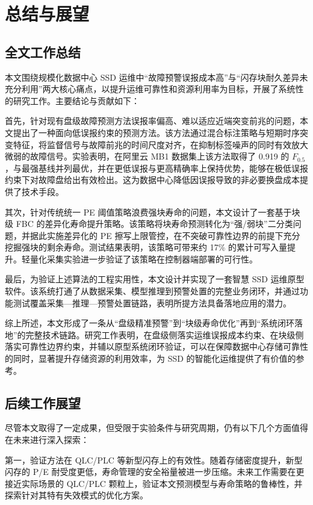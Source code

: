 \chapter{总结与展望}

\section{全文工作总结}

本文围绕规模化数据中心 SSD 运维中“故障预警误报成本高”与“闪存块耐久差异未充分利用”两大核心痛点，以提升运维可靠性和资源利用率为目标，开展了系统性的研究工作。主要结论与贡献如下：

首先，针对现有盘级故障预测方法误报率偏高、难以适应近端突变前兆的问题，本文提出了一种面向低误报约束的预测方法。该方法通过混合标注策略与短期时序突变特征，将监督信号与故障前兆的时间尺度对齐，在抑制标签噪声的同时有效放大微弱的故障信号。实验表明，在阿里云 MB1 数据集上该方法取得了 0.919 的 $F_{0.5}$，与最强基线并列最优，并在更低误报与更高精确率上保持优势，能够在极低误报约束下对故障盘给出有效检出。这为数据中心降低因误报导致的非必要换盘成本提供了技术手段。

其次，针对传统统一 PE 阈值策略浪费强块寿命的问题，本文设计了一套基于块级 FBC 的差异化寿命提升策略。该策略将块寿命预测转化为“强/弱块”二分类问题，并据此实施差异化的 PE 擦写上限管控，在不突破可靠性边界的前提下充分挖掘强块的剩余寿命。测试结果表明，该策略可带来约 17\% 的累计可写入量提升。轻量化采集实验进一步验证了该策略在控制器端部署的可行性。

最后，为验证上述算法的工程实用性，本文设计并实现了一套智慧 SSD 运维原型软件。该系统打通了从数据采集、模型推理到预警处置的完整业务闭环，并通过功能测试覆盖采集—推理—预警处置链路，表明所提方法具备落地应用的潜力。

综上所述，本文形成了一条从“盘级精准预警”到“块级寿命优化”再到“系统闭环落地”的完整技术链路。研究工作表明，在盘级侧落实运维误报成本约束、在块级侧落实可靠性边界约束，并辅以原型系统闭环验证，可以在保障数据中心存储可靠性的同时，显著提升存储资源的利用效率，为 SSD 的智能化运维提供了有价值的参考。

\section{后续工作展望}

尽管本文取得了一定成果，但受限于实验条件与研究周期，仍有以下几个方面值得在未来进行深入探索：

第一，验证方法在 QLC/PLC 等新型闪存上的有效性。随着存储密度提升，新型闪存的 P/E 耐受度更低，寿命管理的安全裕量被进一步压缩。未来工作需要在更接近实际场景的 QLC/PLC 颗粒上，验证本文预测模型与寿命策略的鲁棒性，并探索针对其特有失效模式的优化方案。

